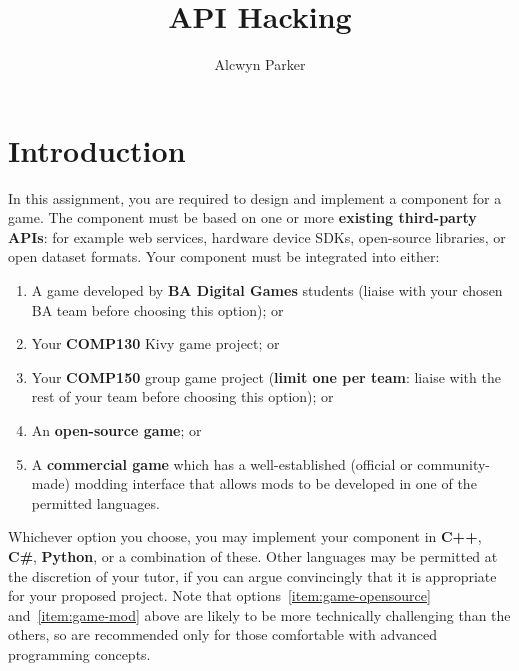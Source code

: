 \documentclass{../fal_assignment}
\title{API Hacking}
\author{Alcwyn Parker}
\begin{document}
\maketitle
%    

\section*{Introduction}

In this assignment, you are required to design and implement a component for a game.
The component must be based on one or more \textbf{existing third-party APIs}:
for example web services, hardware device SDKs, open-source libraries, or open dataset formats.
Your component must be integrated into either:
\begin{enumerate}[label=(\alph*)]
    \item A game developed by \textbf{BA Digital Games} students (liaise with your chosen BA team before choosing this option); or
    \item Your \textbf{COMP130} Kivy game project; or
    \item Your \textbf{COMP150} group game project (\textbf{limit one per team}: liaise with the rest of your team before choosing this option); or
    \item \label{item:game-opensource} An \textbf{open-source game}; or
    \item \label{item:game-mod} A \textbf{commercial game} which has a well-established (official or community-made) modding interface that allows mods to be developed in one of the permitted languages.
\end{enumerate}
Whichever option you choose, you may implement your component in \textbf{C++}, \textbf{C\#}, \textbf{Python}, or a combination of these.
Other languages may be permitted at the discretion of your tutor, if you can argue convincingly that it is appropriate for your proposed project.
Note that options~\ref{item:game-opensource} and~\ref{item:game-mod} above are likely to be more technically challenging than the others,
so are recommended only for those comfortable with advanced programming concepts.
\end{document}
